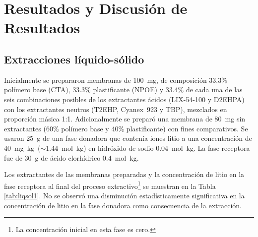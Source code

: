 \chapter{Resultados y Discusión de Resultados}

\section{Extracciones líquido-sólido}\label{sec:Resultsliqsol}
Inicialmente se prepararon membranas de 100~mg, de composición 33.3\% polímero base (CTA), 33.3\% plastificante (NPOE) y 33.4\% de cada una de las seis combinaciones posibles de los extractantes ácidos (LIX-54-100 y D2EHPA) con los extractantes neutros (T2EHP, Cyanex~923 y TBP), mezclados en proporción másica 1:1. Adicionalmente se preparó una membrana de 80~mg sin extractantes (60\% polímero base y 40\% plastificante) con fines comparativos. Se usaron 25~g de una fase donadora que contenía iones litio a una concentración de 40~mg~kg\mnn\ ($\sim$1.44~mol~kg\mnn) en hidróxido de sodio 0.04~mol~kg\mnn. La fase receptora fue de 30~g de ácido clorhídrico 0.4~mol~kg\mnn.

Los extractantes de las membranas preparadas y la concentración de litio en la fase receptora al final del proceso extractivo\footnote{La concentración inicial en esta fase es cero.} se muestran en la Tabla \ref{tab:liqsol1}. No se observó una disminución estadísticamente significativa en la concentración de litio en la fase donadora como consecuencia de la extracción. 

